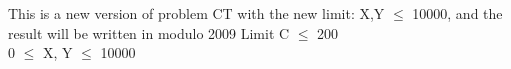 This is a new version of problem CT with the new limit: X,Y $\le$ 10000, and the result will be written in modulo 2009
   Limit  
C  $\le$  200   
\\   0  $\le$  X, Y  $\le$  10000